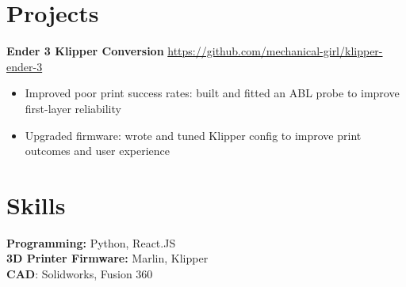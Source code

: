 \documentclass[10pt,a4paper]{article}
\begin{document}
\vspace{-18.5pt}

\section*{Projects}
\textbf{Ender 3 Klipper Conversion} \hfill \href{http://github.com/mechanical-girl/klipper-ender-3}{https://github.com/mechanical-girl/klipper-ender-3} \\
\vspace{-9pt}
\begin{itemize}
	\item Improved poor print success rates: built and fitted an ABL probe to improve first-layer reliability
	\item Upgraded firmware: wrote and tuned Klipper config to improve print outcomes and user experience
\end{itemize}
\section*{Skills}
\textbf{Programming:} Python, React.JS \\
\textbf{3D Printer Firmware:} Marlin, Klipper \\
\textbf{CAD}: Solidworks, Fusion 360 \\

\vspace{-6.5pt}
\end{document}
